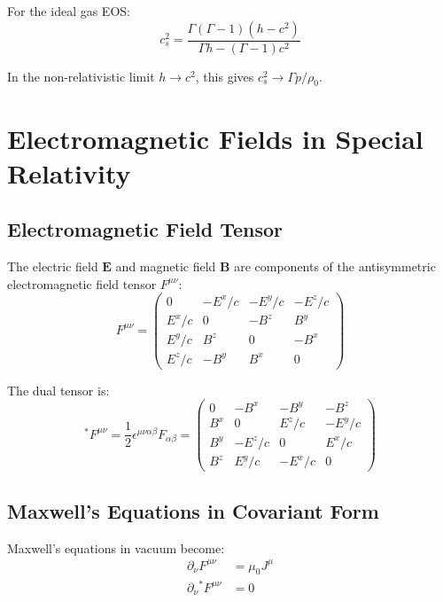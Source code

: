 \documentclass[12pt,a4paper]{article}
\begin{document}
For the ideal gas EOS:
\begin{equation}
c_s^2 = \frac{\Gamma(\Gamma-1)(h-c^2)}{\Gamma h - (\Gamma-1)c^2}
\label{eq:sound_speed_ideal}
\end{equation}

In the non-relativistic limit $h \to c^2$, this gives $c_s^2 \to \Gamma p/\rho_0$.

\section{Electromagnetic Fields in Special Relativity}

\subsection{Electromagnetic Field Tensor}

The electric field $\bm{E}$ and magnetic field $\bm{B}$ are components of the
antisymmetric electromagnetic field tensor $F^{\mu\nu}$:
\begin{equation}
F^{\mu\nu} = \begin{pmatrix}
0 & -E^x/c & -E^y/c & -E^z/c \\
E^x/c & 0 & -B^z & B^y \\
E^y/c & B^z & 0 & -B^x \\
E^z/c & -B^y & B^x & 0
\end{pmatrix}
\label{eq:em_tensor}
\end{equation}

The dual tensor is:
\begin{equation}
{}^*F^{\mu\nu} = \frac{1}{2}\epsilon^{\mu\nu\alpha\beta}F_{\alpha\beta} = \begin{pmatrix}
0 & -B^x & -B^y & -B^z \\
B^x & 0 & E^z/c & -E^y/c \\
B^y & -E^z/c & 0 & E^x/c \\
B^z & E^y/c & -E^x/c & 0
\end{pmatrix}
\label{eq:dual_em_tensor}
\end{equation}

\subsection{Maxwell's Equations in Covariant Form}

Maxwell's equations in vacuum become:
\begin{align}
\partial_\nu F^{\mu\nu} &= \mu_0 J^\mu \label{eq:maxwell_1} \\
\partial_\nu {}^*F^{\mu\nu} &= 0 \label{eq:maxwell_2}
\end{align}
\end{document}
